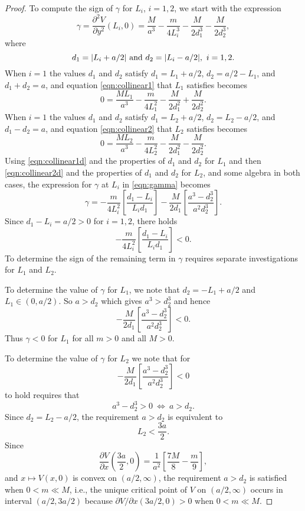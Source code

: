 \documentclass[12pt]{article}
\begin{document}
\begin{proof}
To compute the sign of $\gamma$ for $L_i$, $i=1,2$, we start with the expression
\begin{equation}\label{eqn:gamma}
  \gamma = \frac{\partial^2 V}{\partial y^2}(L_i,0)  
  = \frac{M}{a^3} - \frac{m}{4L_i^3} - \frac{M}{2d_1^3} - \frac{M}{2d_2^3},
\end{equation}
where
\[ d_1 = \vert L_i + a/2\vert {\rm\ and \ } d_2 = \vert L_i - a/2\vert,\ i=1,2.\]
When $i=1$ the values $d_1$ and $d_2$ satisfy $d_1 = L_1 + a/2$, $d_2  = a/2 - L_1$, and $d_1 + d_2 = a$, and equation \eqref{eqn:collinear1} that $L_1$ satisfies becomes
\begin{equation}\label{eqn:collinear1d}
0 = \frac{M L_1}{a^3} - \frac{m}{4 L_1^2} - \frac{M}{2d_1^2} + \frac{M}{2d_2^2}.
\end{equation}
When $i=1$ the values $d_1$ and $d_2$ satisfy $d_1 = L_2 + a/2$, $d_2 = L_2 - a/2$, and $d_1 - d_2 = a$, and equation \eqref{eqn:collinear2} that $L_2$ satisfies becomes
\begin{equation}\label{eqn:collinear2d}
0  =  \frac{M L_2}{a^3} - \frac{m}{4 L_2^2} - \frac{M}{2d_1^2} - \frac{M}{2d_2^2}.
\end{equation}
Using \eqref{eqn:collinear1d} and the properties of $d_1$ and $d_2$ for $L_1$ and then \eqref{eqn:collinear2d} and the properties of $d_1$ and $d_2$ for $L_2$, and some algebra in both cases, the expression for $\gamma$ at $L_i$ in \eqref{eqn:gamma} becomes
\[ \gamma = - \frac{m}{4 L_i^2}\left[\frac{d_1 - L_i}{L_i d_1}\right] - \frac{M}{2d_1}\left[ \frac{a^3 - d_2^3}{a^2d_2^3}\right]. \]
Since $d_1-L_i = a/2 >0$ for $i=1,2$, there holds
\[ - \frac{m}{4L_i^2}\left[\frac{d_1 - L_i}{L_i d_1}\right] < 0.\]
To determine the sign of the remaining term in $\gamma$ requires separate investigations for $L_1$ and $L_2$.

To determine the value of $\gamma$ for $L_1$, we note that $d_2 = -L_1 + a/2$ and $L_1\in (0,a/2)$. So $a>d_2$ which gives $a^3>d_2^3$ and hence
\[ - \frac{M}{2d_1}\left[ \frac{a^3 - d_2^3}{a^2d_2^3}\right] < 0.\]
Thus $\gamma<0$ for $L_1$ for all $m>0$ and all $M>0$.

To determine the value of $\gamma$ for $L_2$ we note that for
\[ - \frac{M}{2d_1}\left[ \frac{a^3 - d_2^3}{a^2d_2^3}\right] < 0\]
to hold requires that
\[ a^3 - d_2^3 > 0  \ \Leftrightarrow\ a > d_2.\]
Since $d_2 = L_2 - a/2$, the requirement $a>d_2$ is equivalent to
\[ L_2 < \frac{3a}{2}.\]
Since
\[ \frac{\partial V}{\partial x}\left( \frac{3a}{2},0\right) = \frac{1}{a^2}\left[ \frac{7M}{8} - \frac{m}{9}\right],\]
and $x\mapsto V(x,0)$ is convex on $(a/2,\infty)$, the requirement $a>d_2$ is satisfied when $0<m\ll M$, i.e., the unique critical point of $V$ on $(a/2,\infty)$ occurs in interval $(a/2, 3a/2)$ because $\partial V/\partial x(3a/2,0)>0$ when $0<m\ll M$.


\end{proof}
\end{document}
